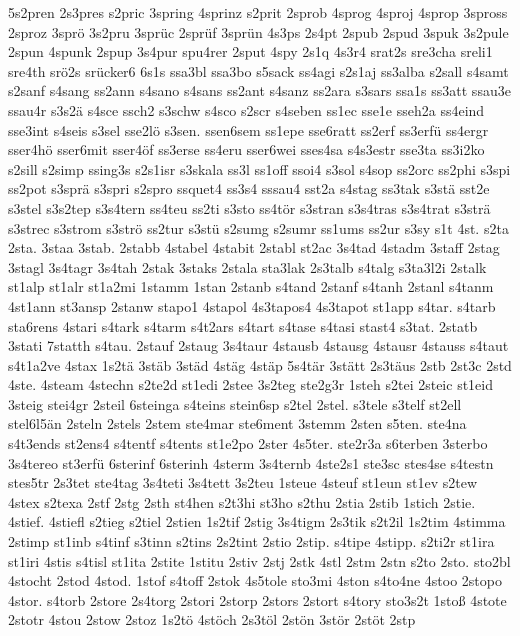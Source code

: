 {5s2pren
2s3pres
s2pric
3spring
4sprinz
s2prit
2sprob
4sprog
4sproj
4sprop
3spross
2sproz
3sprö
3s2pru
3sprüc
2sprüf
3sprün
4s3ps
2s4pt
2spub
2spud
3spuk
3s2pule
2spun
4spunk
2spup
3s4pur
spu4rer
2sput
4spy
2s1q
4s3r4
srat2s
sre3cha
sreli1
sre4th
srö2s
srücker6
6s1s
ssa3bl
ssa3bo
s5sack
ss4agi
s2s1aj
ss3alba
s2sall
s4samt
s2sanf
s4sang
ss2ann
s4sano
s4sans
ss2ant
s4sanz
ss2ara
s3sars
ssa1s
ss3att
ssau3e
ssau4r
s3s2ä
s4sce
ssch2
s3schw
s4sco
s2scr
s4seben
ss1ec
sse1e
sseh2a
ss4eind
sse3int
s4seis
s3sel
sse2lö
s3sen.
ssen6sem
ss1epe
sse6ratt
ss2erf
ss3erfü
ss4ergr
sser4hö
sser6mit
sser4öf
ss3erse
ss4eru
sser6wei
sses4sa
s4s3estr
sse3ta
ss3i2ko
s2sill
s2simp
ssing3s
s2s1isr
s3skala
ss3l
ss1off
ssoi4
s3sol
s4sop
ss2orc
ss2phi
s3spi
ss2pot
s3sprä
s3spri
s2spro
ssquet4
ss3s4
sssau4
sst2a
s4stag
ss3tak
s3stä
sst2e
s3stel
s3s2tep
s3s4tern
ss4teu
ss2ti
s3sto
ss4tör
s3stran
s3s4tras
s3s4trat
s3strä
s3strec
s3strom
s3strö
ss2tur
s3stü
s2sumg
s2sumr
ss1ums
ss2ur
s3sy
s1t
4st.
s2ta
2sta.
3staa
3stab.
2stabb
4stabel
4stabit
2stabl
st2ac
3s4tad
4stadm
3staff
2stag
3stagl
3s4tagr
3s4tah
2stak
3staks
2stala
sta3lak
2s3talb
s4talg
s3ta3l2i
2stalk
st1alp
st1alr
st1a2mi
1stamm
1stan
2stanb
s4tand
2stanf
s4tanh
2stanl
s4tanm
4st1ann
st3ansp
2stanw
stapo1
4stapol
4s3tapos4
4s3tapot
st1app
s4tar.
s4tarb
sta6rens
4stari
s4tark
s4tarm
s4t2ars
s4tart
s4tase
s4tasi
stast4
s3tat.
2statb
3stati
7statth
s4tau.
2stauf
2staug
3s4taur
4stausb
4stausg
4stausr
4stauss
s4taut
s4t1a2ve
4stax
1s2tä
3stäb
3städ
4stäg
4stäp
5s4tär
3stätt
2s3täus
2stb
2st3c
2std
4ste.
4steam
4stechn
s2te2d
st1edi
2stee
3s2teg
ste2g3r
1steh
s2tei
2steic
st1eid
3steig
stei4gr
2steil
6steinga
s4teins
stein6sp
s2tel
2stel.
s3tele
s3telf
st2ell
stel6l5än
2steln
2stels
2stem
ste4mar
ste6ment
3stemm
2sten
s5ten.
ste4na
s4t3ends
st2ens4
s4tentf
s4tents
st1e2po
2ster
4s5ter.
ste2r3a
s6terben
3sterbo
3s4tereo
st3erfü
6sterinf
6sterinh
4sterm
3s4ternb
4ste2s1
ste3sc
stes4se
s4testn
stes5tr
2s3tet
ste4tag
3s4teti
3s4tett
3s2teu
1steue
4steuf
st1eun
st1ev
s2tew
4stex
s2texa
2stf
2stg
2sth
st4hen
s2t3hi
st3ho
s2thu
2stia
2stib
1stich
2stie.
4stief.
4stiefl
s2tieg
s2tiel
2stien
1s2tif
2stig
3s4tigm
2s3tik
s2t2il
1s2tim
4stimma
2stimp
st1inb
s4tinf
s3tinn
s2tins
2s2tint
2stio
2stip.
s4tipe
4stipp.
s2ti2r
st1ira
st1iri
4stis
s4tisl
st1ita
2stite
1stitu
2stiv
2stj
2stk
4stl
2stm
2stn
s2to
2sto.
sto2bl
4stocht
2stod
4stod.
1stof
s4toff
2stok
4s5tole
sto3mi
4ston
s4to4ne
4stoo
2stopo
4stor.
s4torb
2store
2s4torg
2stori
2storp
2stors
2stort
s4tory
sto3s2t
1stoß
4stote
2stotr
4stou
2stow
2stoz
1s2tö
4stöch
2s3töl
2stön
3stör
2stöt
2stp
}
